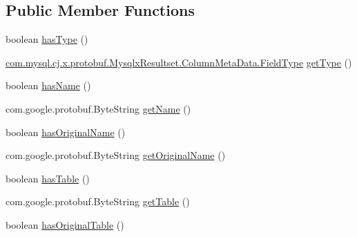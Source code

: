 \subsection*{Public Member Functions}
\begin{DoxyCompactItemize}
\item 
boolean \mbox{\hyperlink{interfacecom_1_1mysql_1_1cj_1_1x_1_1protobuf_1_1_mysqlx_resultset_1_1_column_meta_data_or_builder_a2dbec610dcbfdd2b3933b5a28cf04db7}{has\+Type}} ()
\item 
\mbox{\hyperlink{enumcom_1_1mysql_1_1cj_1_1x_1_1protobuf_1_1_mysqlx_resultset_1_1_column_meta_data_1_1_field_type}{com.\+mysql.\+cj.\+x.\+protobuf.\+Mysqlx\+Resultset.\+Column\+Meta\+Data.\+Field\+Type}} \mbox{\hyperlink{interfacecom_1_1mysql_1_1cj_1_1x_1_1protobuf_1_1_mysqlx_resultset_1_1_column_meta_data_or_builder_a83e78604f3113895c027cb32474ce94f}{get\+Type}} ()
\item 
boolean \mbox{\hyperlink{interfacecom_1_1mysql_1_1cj_1_1x_1_1protobuf_1_1_mysqlx_resultset_1_1_column_meta_data_or_builder_a37a241fdde884781143f8faa577e7b3c}{has\+Name}} ()
\item 
com.\+google.\+protobuf.\+Byte\+String \mbox{\hyperlink{interfacecom_1_1mysql_1_1cj_1_1x_1_1protobuf_1_1_mysqlx_resultset_1_1_column_meta_data_or_builder_a6c3a18c7f5568afc606d20bd4cb48da6}{get\+Name}} ()
\item 
boolean \mbox{\hyperlink{interfacecom_1_1mysql_1_1cj_1_1x_1_1protobuf_1_1_mysqlx_resultset_1_1_column_meta_data_or_builder_a83b5a8374ae61cbea24efbe75b0bf80f}{has\+Original\+Name}} ()
\item 
com.\+google.\+protobuf.\+Byte\+String \mbox{\hyperlink{interfacecom_1_1mysql_1_1cj_1_1x_1_1protobuf_1_1_mysqlx_resultset_1_1_column_meta_data_or_builder_ad5a3de637a06b892e1e3c7b331a66541}{get\+Original\+Name}} ()
\item 
boolean \mbox{\hyperlink{interfacecom_1_1mysql_1_1cj_1_1x_1_1protobuf_1_1_mysqlx_resultset_1_1_column_meta_data_or_builder_a9c97ac43ab526deade498d2bfb621daa}{has\+Table}} ()
\item 
com.\+google.\+protobuf.\+Byte\+String \mbox{\hyperlink{interfacecom_1_1mysql_1_1cj_1_1x_1_1protobuf_1_1_mysqlx_resultset_1_1_column_meta_data_or_builder_a2b119da1157d702802c4d9d4d03419a7}{get\+Table}} ()
\item 
boolean \mbox{\hyperlink{interfacecom_1_1mysql_1_1cj_1_1x_1_1protobuf_1_1_mysqlx_resultset_1_1_column_meta_data_or_builder_a4e44a06e33aa53a30699cda38a36ea1b}{has\+Original\+Table}} ()
\item 

\end{DoxyCompactItemize}
